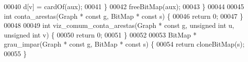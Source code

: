 \begin{DoxyCode}
00040                 d[v] = cardOf(aux);
00041         \}
00042         freeBitMap(aux);
00043 \}
00044 
00045 \textcolor{keywordtype}{int} conta_arestas(Graph * \textcolor{keyword}{const} g, BitMap * \textcolor{keyword}{const} s) \{
00046         \textcolor{keywordflow}{return} 0;
00047 \}
00048 
00049 \textcolor{keywordtype}{int} viz_comum_conta_arestas(Graph * \textcolor{keyword}{const} g, \textcolor{keywordtype}{unsigned} \textcolor{keywordtype}{int} u, \textcolor{keywordtype}{unsigned} \textcolor{keywordtype}{int} v) \{
00050         \textcolor{keywordflow}{return} 0;
00051 \}
00052 
00053 BitMap * grau_impar(Graph * \textcolor{keyword}{const} g, BitMap * \textcolor{keyword}{const} s) \{
00054         \textcolor{keywordflow}{return} cloneBitMap(s);
00055 \}
\end{DoxyCode}
